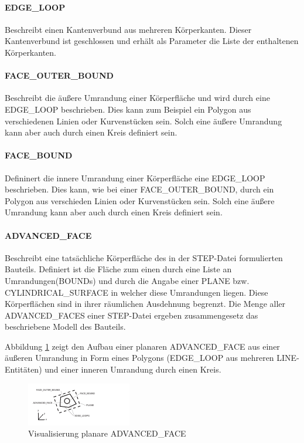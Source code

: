 \paragraph{EDGE\_LOOP}

Beschreibt einen Kantenverbund aus mehreren Körperkanten. Dieser Kantenverbund ist geschlossen und erhält als Parameter die Liste der enthaltenen Körperkanten. 

\paragraph{FACE\_OUTER\_BOUND}

Beschreibt die äußere Umrandung einer Körperfläche und wird durch eine EDGE\_LOOP beschrieben. Dies kann zum Beispiel ein Polygon aus verschiedenen Linien oder Kurvenstücken sein. Solch eine äußere Umrandung kann aber auch durch einen Kreis definiert sein.

\paragraph{FACE\_BOUND}

Defininert die innere Umrandung einer Körperfläche eine EDGE\_LOOP beschrieben. Dies kann, wie bei einer FACE\_OUTER\_BOUND, durch ein Polygon aus verschieden Linien oder Kurvenstücken sein. Solch eine äußere Umrandung kann aber auch durch einen Kreis definiert sein.   

\paragraph{ADVANCED\_FACE}

Beschreibt eine tatsächliche Körperfläche des in der STEP-Datei formulierten Bauteils. Definiert ist die Fläche zum einen durch eine Liste an Umrandungen(BOUNDs) und durch die Angabe einer PLANE bzw. CYLINDRICAL\_SURFACE in welcher diese Umrandungen liegen. Diese Körperflächen sind in ihrer räumlichen Ausdehnung begrenzt. Die Menge aller ADVANCED\_FACES einer STEP-Datei ergeben zusammengesetz das beschriebene Modell des Bauteils. 

Abbildung \ref{fig:advancedfaceentity} zeigt den Aufbau einer planaren ADVANCED\_FACE aus einer äußeren Umrandung in Form eines Polygons (EDGE\_LOOP aus mehreren LINE-Entitäten) und einer inneren Umrandung durch einen Kreis.  

\begin{figure}[h]
	\centering
	
	\includegraphics[width=0.7\linewidth]{img/advancedface_entity.pdf}
	
	\caption{Visualisierung planare ADVANCED\_FACE}
	\label{fig:advancedfaceentity}
	
\end{figure}

